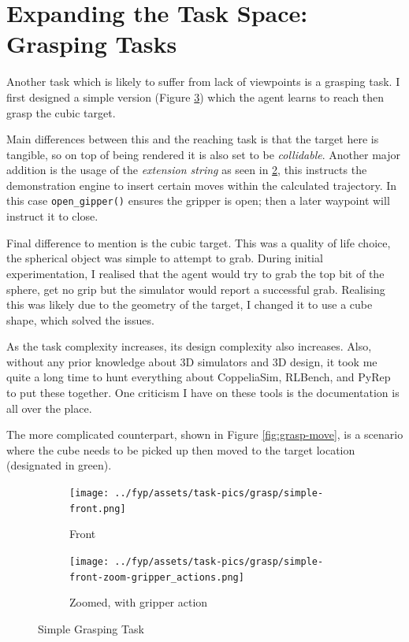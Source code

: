 \section{Expanding the Task Space: Grasping Tasks}
Another task which is likely to suffer from lack of viewpoints is a grasping task. I first designed
a simple version (Figure \ref{fig:grasp-simple}) which the agent learns to reach then grasp the cubic target. 

Main differences between this and the reaching task is that the target here is tangible, so on top of being rendered it is also set to be \emph{collidable}. Another major addition is the usage of the \emph{extension string} as seen in \ref{subfig:simple-zoom-actions}, this instructs the demonstration engine to insert certain moves within the calculated trajectory. In this case \verb|open_gipper()| ensures the gripper is open; then a later waypoint will instruct it to close. 

Final difference to mention is the cubic target. This was a quality of life choice, the spherical object was simple to attempt to grab. During initial experimentation, I realised that the agent would try to grab the top bit of the sphere, get no grip but the simulator would report a successful grab. Realising this was likely due to the geometry of the target, I changed it to use a cube shape, which solved the issues.\todo[color=purple]{}

As the task complexity increases, its design complexity also increases. Also, without any prior knowledge about 3D simulators and 3D design, it took me quite a long time to hunt everything about CoppeliaSim, RLBench, and PyRep to put these together. One criticism I have on these tools is the documentation is all over the place. 

The more complicated counterpart, shown in Figure \ref{fig:grasp-move}, is a scenario where the cube needs to be picked up then moved to the target location (designated in green).

\begin{figure}[htpb] %
  \centering
  \begin{subfigure}{0.3\linewidth}
    \centering
    \texttt{[image: ../fyp/assets/task-pics/grasp/simple-front.png]}
    \caption{Front}\label{subfig:simple-front}
  \end{subfigure}
  \begin{subfigure}{0.5\linewidth}
    \centering
    \texttt{[image: ../fyp/assets/task-pics/grasp/simple-front-zoom-gripper\_actions.png]}
    \caption{Zoomed, with gripper action}\label{subfig:simple-zoom-actions}
  \end{subfigure}
  \caption{Simple Grasping Task}\label{fig:grasp-simple}
\end{figure}

